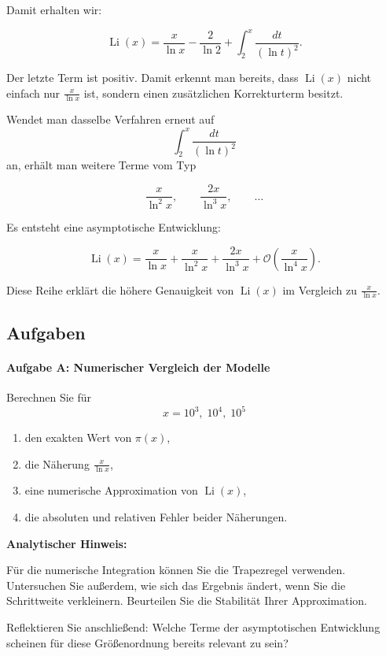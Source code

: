 \documentclass[../Mathe_Aufgaben.tex]{subfiles}
\begin{document}
Damit erhalten wir:

\[
\operatorname{Li}(x)
=
\frac{x}{\ln x}
-
\frac{2}{\ln 2}
+
\int_2^x\frac{dt}{(\ln t)^2}.
\]

Der letzte Term ist positiv.
Damit erkennt man bereits,
dass $\operatorname{Li}(x)$ nicht einfach nur $\frac{x}{\ln x}$
ist, sondern einen zusätzlichen Korrekturterm besitzt.

Wendet man dasselbe Verfahren erneut auf
\[
\int_2^x\frac{dt}{(\ln t)^2}
\]
an, erhält man weitere Terme vom Typ

\[
\frac{x}{\ln^2 x},\qquad
\frac{2x}{\ln^3 x},\qquad \dots
\]

Es entsteht eine asymptotische Entwicklung:

\[
\operatorname{Li}(x)
=
\frac{x}{\ln x}
+
\frac{x}{\ln^2 x}
+
\frac{2x}{\ln^3 x}
+
\mathcal{O}\!\left(\frac{x}{\ln^4 x}\right).
\]

Diese Reihe erklärt die höhere Genauigkeit von
$\operatorname{Li}(x)$ im Vergleich zu $\frac{x}{\ln x}$.

\bigskip

\subsection*{Aufgaben}

\paragraph{Aufgabe A: Numerischer Vergleich der Modelle}

Berechnen Sie für
\[
x=10^3,\;10^4,\;10^5
\]

\begin{enumerate}
\item den exakten Wert von $\pi(x)$,
\item die Näherung $\frac{x}{\ln x}$,
\item eine numerische Approximation von $\operatorname{Li}(x)$,
\item die absoluten und relativen Fehler beider Näherungen.
\end{enumerate}

\textbf{Analytischer Hinweis:}

Für die numerische Integration können Sie die Trapezregel verwenden.
Untersuchen Sie außerdem, wie sich das Ergebnis ändert,
wenn Sie die Schrittweite verkleinern.
Beurteilen Sie die Stabilität Ihrer Approximation.

Reflektieren Sie anschließend:
Welche Terme der asymptotischen Entwicklung
scheinen für diese Größenordnung bereits relevant zu sein?
\end{document}
